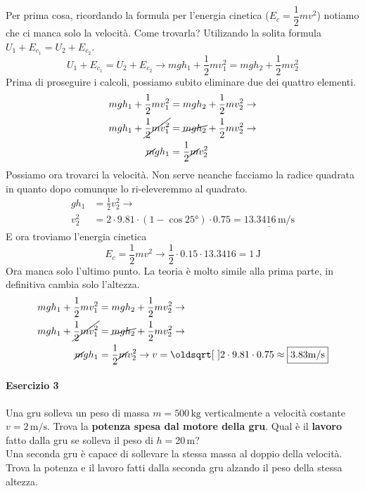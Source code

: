 Per prima cosa, ricordando la formula per l'energia cinetica ($E_c = \dfrac{1}{2}mv^2$) notiamo che ci
manca solo la velocità. Come trovarla? Utilizando la solita formula $U_1+E_{c_1} = U_2 + E_{c_2}$.
\begin{equation*}
  U_1+E_{c_1} = U_2 + E_{c_2} \rightarrow mgh_1 + \frac{1}{2}mv_1^2 = mgh_2 + \frac{1}{2}mv_2^2
\end{equation*}
Prima di proseguire i calcoli, possiamo subito eliminare due dei quattro elementi.
\begin{align*}
  mgh_1 + \frac{1}{2}mv_1^2 &= mgh_2 + \frac{1}{2}mv_2^2 \rightarrow\\
  mgh_1 + \cancel{\frac{1}{2}mv_1^2} &= \cancel{mgh_2} + \frac{1}{2}mv_2^2 \rightarrow\\
  \cancel{m}gh_1 &= \frac{1}{2}\cancel{m}v_2^2
\end{align*}
Possiamo ora trovarci la velocità. Non serve neanche facciamo la radice quadrata in quanto dopo 
comunque lo ri-eleveremmo al quadrato.
\begin{align*}
  gh_1 &= \frac{1}{2}v_2^2 \rightarrow \\
  v_2^2 &= 2\cdot9.81\cdot(1-\cos\ang{25})\cdot0.75 = 
  \underline{13.3416\,\text{m/s}}
\end{align*}
E ora troviamo l'energia cinetica
\begin{equation*}
  E_c = \frac{1}{2}mv^2 \rightarrow \frac{1}{2}\cdot0.15\cdot13.3416 = \boxed{1\,\text{J}}
\end{equation*}
Ora manca solo l'ultimo punto. La teoria è molto simile alla prima parte, in definitiva cambia solo 
l'altezza.
\begin{align*}
  mgh_1 + \frac{1}{2}mv_1^2 &= mgh_2 + \frac{1}{2}mv_2^2 \rightarrow\\
  mgh_1 + \cancel{\frac{1}{2}mv_1^2} &= \cancel{mgh_2} + \frac{1}{2}mv_2^2 \rightarrow\\
  \cancel{m}gh_1 &= \frac{1}{2}\cancel{m}v_2^2 \rightarrow
  v = \sqrt{2\cdot9.81\cdot0.75} \approx \boxed{3.83\text{m/s}}
\end{align*}

\paragraph{Esercizio 3}
Una gru solleva un peso di massa $m = 500\,\text{kg}$ verticalmente a velocità costante 
$v = 2\,\text{m/s}$. Trova la \textbf{potenza spesa dal motore della gru}. Qual è il \textbf{lavoro}
fatto dalla gru se solleva il peso di $h = 20\,\text{m}$?\\
Una seconda gru è capace di sollevare la stessa massa al doppio della velocità. Trova la potenza
e il lavoro fatti dalla seconda gru alzando il peso della stessa altezza.

